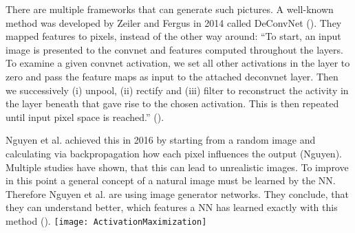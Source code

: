 There are multiple frameworks that can generate such pictures. A well-known method was developed by Zeiler and Fergus in 2014 called DeConvNet (). They mapped features to pixels, instead of the other way around:
“To start, an input image is presented to the convnet and features computed throughout the layers. To examine a given convnet activation, we set all other activations in the layer to zero and pass the feature maps as input to the attached deconvnet layer. Then we successively (i) unpool, (ii) rectify and (iii) filter to reconstruct the activity in the layer beneath that gave rise to the chosen activation. This is then repeated until input pixel space is reached.” ().
\par
Nguyen et al. achieved this in 2016 by starting from a random image and calculating via backpropagation how each pixel influences the output (Nguyen). Multiple studies have shown, that this can lead to unrealistic images. To improve in this point a general concept of a natural image must be learned by the NN. Therefore Nguyen et al. are using image generator networks. They conclude, that they can understand better, which features a NN has learned exactly with this method ().
\texttt{[image: ActivationMaximization]}

